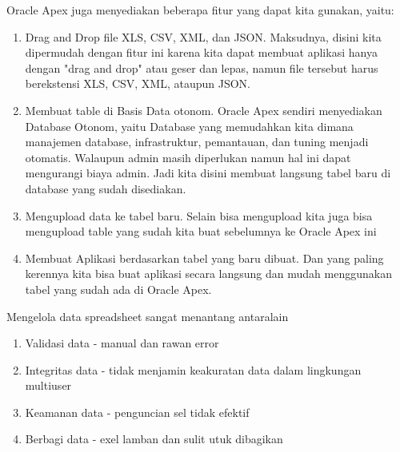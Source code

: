 Oracle Apex juga menyediakan beberapa fitur yang dapat kita gunakan, yaitu:
\begin{enumerate}
    \item Drag and Drop file XLS, CSV, XML, dan JSON.
    Maksudnya, disini kita dipermudah dengan fitur ini karena kita dapat membuat aplikasi hanya dengan "drag and drop" atau geser dan lepas, namun file tersebut harus berekstensi XLS, CSV, XML, ataupun JSON.
    \item Membuat table di Basis Data otonom.
    Oracle Apex sendiri menyediakan Database Otonom, yaitu Database yang memudahkan kita dimana manajemen database, infrastruktur, pemantauan, dan tuning menjadi otomatis. Walaupun admin masih diperlukan namun hal ini dapat mengurangi biaya admin. Jadi kita disini membuat langsung tabel baru di database yang sudah disediakan. 
    \item Mengupload data ke tabel baru.
    Selain bisa mengupload kita juga bisa mengupload table yang sudah kita buat sebelumnya ke Oracle Apex ini
    \item Membuat Aplikasi berdasarkan tabel yang baru dibuat.
    Dan yang paling kerennya kita bisa buat aplikasi secara langsung dan mudah menggunakan tabel yang sudah ada di Oracle Apex.
\end{enumerate}

Mengelola data spreadsheet sangat menantang antaralain
  \begin{enumerate}
      \item Validasi data    \-- manual dan rawan error
      \item Integritas data  \-- tidak menjamin keakuratan data dalam lingkungan multiuser
      \item Keamanan data    \-- penguncian sel tidak efektif
      \item Berbagi data     \-- exel lamban dan sulit utuk dibagikan
  \end{enumerate}  
  
